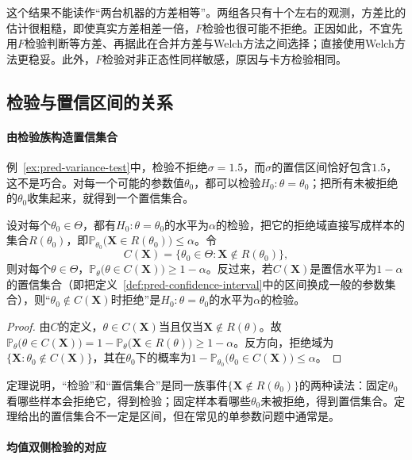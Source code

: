 这个结果不能读作“两台机器的方差相等”。两组各只有十个左右的观测，方差比的估计很粗糙，即使真实方差相差一倍，$F$检验也很可能不拒绝。正因如此，不宜先用$F$检验判断等方差、再据此在合并方差与Welch方法之间选择；直接使用Welch方法更稳妥。此外，$F$检验对非正态性同样敏感，原因与卡方检验相同。

\subsection{检验与置信区间的关系}

\paragraph{由检验族构造置信集合}

例~\ref{ex:pred-variance-test}中，检验不拒绝$\sigma=1.5$，而$\sigma$的置信区间恰好包含$1.5$，这不是巧合。对每一个可能的参数值$\theta_0$，都可以检验$H_0:\theta=\theta_0$；把所有未被拒绝的$\theta_0$收集起来，就得到一个置信集合。

\begin{theorem}[检验与置信集合的对偶]
\label{thm:pred-test-interval-duality}
设对每个$\theta_0\in\Theta$，都有$H_0:\theta=\theta_0$的水平为$\alpha$的检验，把它的拒绝域直接写成样本的集合$R(\theta_0)$，即$\mathbb P_{\theta_0}\bigl(\bm X\in R(\theta_0)\bigr)\leq\alpha$。令
\[
 C(\bm X)=\{\theta_0\in\Theta:\bm X\notin R(\theta_0)\},
\]
则对每个$\theta\in\Theta$，$\mathbb P_\theta\bigl(\theta\in C(\bm X)\bigr)\geq1-\alpha$。反过来，若$C(\bm X)$是置信水平为$1-\alpha$的置信集合（即把定义~\ref{def:pred-confidence-interval}中的区间换成一般的参数集合），则“$\theta_0\notin C(\bm X)$时拒绝”是$H_0:\theta=\theta_0$的水平为$\alpha$的检验。
\end{theorem}

\begin{proof}
由$C$的定义，$\theta\in C(\bm X)$当且仅当$\bm X\notin R(\theta)$。故$\mathbb P_\theta\bigl(\theta\in C(\bm X)\bigr)=1-\mathbb P_\theta\bigl(\bm X\in R(\theta)\bigr)\geq1-\alpha$。反方向，拒绝域为$\{\bm X:\theta_0\notin C(\bm X)\}$，其在$\theta_0$下的概率为$1-\mathbb P_{\theta_0}\bigl(\theta_0\in C(\bm X)\bigr)\leq\alpha$。
\end{proof}

定理说明，“检验”和“置信集合”是同一族事件$\{\bm X\notin R(\theta_0)\}$的两种读法：固定$\theta_0$看哪些样本会拒绝它，得到检验；固定样本看哪些$\theta_0$未被拒绝，得到置信集合。定理给出的置信集合不一定是区间，但在常见的单参数问题中通常是。

\paragraph{均值双侧检验的对应}

